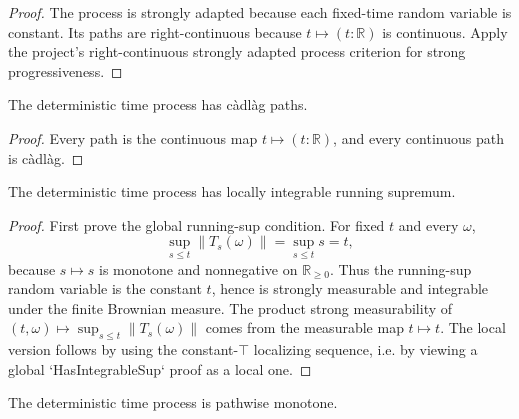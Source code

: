 \begin{proof}

\leanok
The process is strongly adapted because each fixed-time random variable is
constant.  Its paths are right-continuous because
\(t\mapsto(t:\mathbb R)\) is continuous.  Apply the project's
right-continuous strongly adapted process criterion for strong
progressiveness.
\end{proof}

\begin{lemma}\label{lem:brownianDeterministicTime_cadlag}
  \leanok
The deterministic time process has càdlàg paths.
\end{lemma}

\begin{proof}

\leanok
Every path is the continuous map \(t\mapsto (t:\mathbb R)\), and every
continuous path is càdlàg.
\end{proof}

\begin{lemma}\label{lem:brownianDeterministicTime_hasLocallyIntegrableSup}
  \leanok
The deterministic time process has locally integrable running supremum.
\end{lemma}

\begin{proof}

\leanok
First prove the global running-sup condition.  For fixed \(t\) and every
\(\omega\),
\[
  \sup_{s\le t} \|T_s(\omega)\| = \sup_{s\le t} s = t,
\]
because \(s\mapsto s\) is monotone and nonnegative on \(\mathbb R_{\ge 0}\).
Thus the running-sup random variable is the constant \(t\), hence is strongly
measurable and integrable under the finite Brownian measure.  The product
strong measurability of \((t,\omega)\mapsto\sup_{s\le t}\|T_s(\omega)\|\)
comes from the measurable map \(t\mapsto t\).  The local version follows by
using the constant-\(\top\) localizing sequence, i.e. by viewing a global
`HasIntegrableSup` proof as a local one.
\end{proof}

\begin{lemma}\label{lem:brownianDeterministicTime_monotone}
  \leanok
The deterministic time process is pathwise monotone.
\end{lemma}


